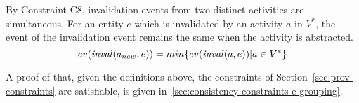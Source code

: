 \vspace*{10pt}
\begin{definition} 
  \label{def:abstract-inv-a}
  By Constraint C8, invalidation events from two distinct activities are simultaneous.
For an entity $e$ which is invalidated by an activity $a$ in $V^*$, the event of the invalidation event remains the same when the activity is abstracted.
\[
ev(\mathit{inval}(a_{new},e)) = min\{ev(\mathit{inval}(a,e)) | a \in V^*\}
\]
\end{definition}

A proof of that, given the definitions above, the  constraints of Section~\ref{sec:prov-constraints} are satisfiable, is given in~\ref{sec:consistency-constraints-e-grouping}.


